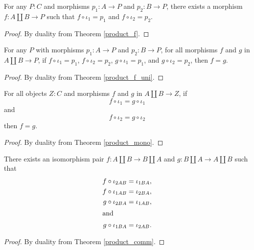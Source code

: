 \documentclass[../math.tex]{subfiles}
\begin{document}
\begin{theorem} \label{coproduct_f} \label{coproduct_f1} \label{coproduct_f2}
    For any $P : C$ and morphisms $p_1 : A \to P$ and $p_2 : B \to P$, there
    exists a morphism $f : A \amalg B \to P$ such that $f \circ \iota_1 = p_1$
    and $f \circ \iota_2 = p_2$.
\end{theorem}
\begin{proof}
    By duality from Theorem \ref{product_f}.
\end{proof}

\begin{theorem} \label{coproduct_f_uni} \label{coproduct_f_uni2}
    For any $P$ with morphisms $p_1 : A \to P$ and $p_2 : B \to P$, for all
    morphisms $f$ and $g$ in $A \amalg B \to P$, if $f \circ \iota_1 = p_1$, $f
    \circ \iota_2 = p_2$, $g \circ \iota_1 = p_1$, and $g \circ \iota_2 = p_2$,
    then $f = g$.
\end{theorem}
\begin{proof}
    By duality from Theorem \ref{product_f_uni}.
\end{proof}

\begin{theorem} \label{coproduct_epi}
    For all objects $Z : C$ and morphisms $f$ and $g$ in $A \amalg B \to Z$,
    if
    \[
        f \circ \iota_1 = g \circ \iota_1
    \]
    and
    \[
        f \circ \iota_2 = g \circ \iota_2
    \]
    then $f = g$.
\end{theorem}
\begin{proof}
    By duality from Theorem \ref{product_mono}.
\end{proof}

\begin{theorem} \label{coproduct_comm}
    There exists an isomorphism pair $f : A \amalg B \to B \amalg A$ and $g : B
    \amalg A \to A \amalg B$ such that
    \begin{align*}
        f \circ \iota_{2AB} &= \iota_{1BA}, \\
        f \circ \iota_{1AB} &= \iota_{2BA}, \\
        g \circ \iota_{2BA} &= \iota_{1AB}, \\
    \intertext{and}
        g \circ \iota_{1BA} &= \iota_{2AB}.
    \end{align*}
\end{theorem}
\begin{proof}
    By duality from Theorem \ref{product_comm}.
\end{proof}
\end{document}
